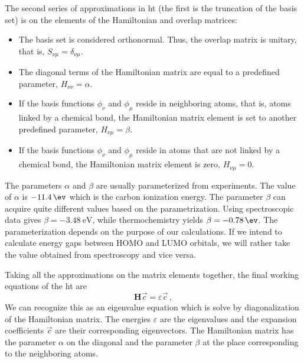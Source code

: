 The second series of approximations in \acrshort{ht} (the first is the truncation of the basis set) is on the elements of the Hamiltonian and overlap matrices:
\begin{itemize}
    \item The basis set is considered orthonormal. Thus, the overlap matrix is unitary, that is, $S_{\nu\mu} = \delta_{\nu\mu}$.
    \item The diagonal terms of the Hamiltonian matrix are equal to a predefined parameter,  $H_{\nu\nu} = \alpha$.
    \item If the basis functions $\phi_\nu$ and $\phi_\mu$ reside in neighboring atoms, that is, atoms linked by a chemical bond, the Hamiltonian matrix element is set to another predefined parameter, $H_{\nu\mu} = \beta$.
    \item If the basis functions $\phi_\nu$ and $\phi_\mu$ reside in atoms that are not linked by a chemical bond, the Hamiltonian matrix element is zero, $H_{\nu\mu} = 0$.
\end{itemize}
The parameters $\alpha$ and $\beta$ are usually parameterized from experiments. The value of $\alpha$ is $\SI{-11.4}{\ev}$ which is the carbon ionization energy. The parameter $\beta$ can acquire quite different values based on the parametrization. Using spectroscopic data gives $\beta = \SI{-3.48}{\eV}$, while thermochemistry yields $\beta = \SI{-0.78}{\ev}$. The parameterization depends on the purpose of our calculations. If we intend to calculate energy gaps between HOMO and LUMO orbitals, we will rather take the value obtained from spectroscopy and vice versa.

Taking all the approximations on the matrix elements together, the final working equations of the \acrlong{ht} are 
\begin{equation}
\mathbf{H}\Vec{c}=\varepsilon\Vec{c}\, ,
\label{eq:huckel7}
\end{equation}
We can recognize this as an eigenvalue equation which is solve by diagonalization of the Hamiltonian matrix. The energies $\varepsilon$ are the eigenvalues and the expansion coefficients $\Vec{c}$ are their corresponding eigenvectors. The Hamiltonian matrix has the parameter $\alpha$ on the diagonal and the parameter $\beta$ at the place corresponding to the neighboring atoms. 

